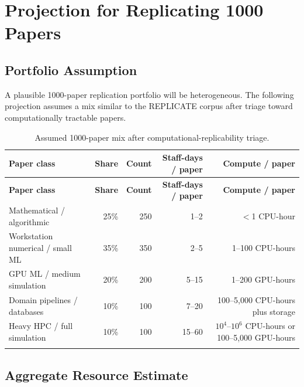 \documentclass[11pt,letterpaper]{article}
\begin{document}
\section{Projection for Replicating 1000 Papers}

\subsection{Portfolio Assumption}

A plausible 1000-paper replication portfolio will be heterogeneous. The following projection assumes a mix similar to the REPLICATE corpus after triage toward computationally tractable papers.

\begin{longtable}{p{4.0cm}r r r r}
\toprule
\textbf{Paper class} & \textbf{Share} & \textbf{Count} & \textbf{Staff-days / paper} & \textbf{Compute / paper} \\
\midrule
\endfirsthead
\toprule
\textbf{Paper class} & \textbf{Share} & \textbf{Count} & \textbf{Staff-days / paper} & \textbf{Compute / paper} \\
\midrule
\endhead
Mathematical / algorithmic & 25\% & 250 & 1--2 & $<$1 CPU-hour \\
Workstation numerical / small ML & 35\% & 350 & 2--5 & 1--100 CPU-hours \\
GPU ML / medium simulation & 20\% & 200 & 5--15 & 1--200 GPU-hours \\
Domain pipelines / databases & 10\% & 100 & 7--20 & 100--5,000 CPU-hours plus storage \\
Heavy HPC / full simulation & 10\% & 100 & 15--60 & $10^4$--$10^6$ CPU-hours or 100--5,000 GPU-hours \\
\bottomrule
\caption{Assumed 1000-paper mix after computational-replicability triage.}
\end{longtable}

\subsection{Aggregate Resource Estimate}
\end{document}

